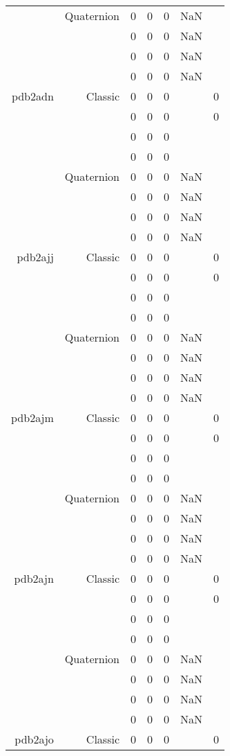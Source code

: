 \begin{xltabular}{\textwidth}{r|rcccSc}
& Quaternion & 0 & 0 & 0 & NaN & \\
& & 0 & 0 & 0 & NaN & \\
& & 0 & 0 & 0 & NaN & \\
& & 0 & 0 & 0 & NaN & \\ \addlinespace
pdb2adn & Classic & 0 & 0 & 0 & & 0 \\
& & 0 & 0 & 0 & & 0 \\
& & 0 & 0 & 0 & & \\
& & 0 & 0 & 0 & & \\
& Quaternion & 0 & 0 & 0 & NaN & \\
& & 0 & 0 & 0 & NaN & \\
& & 0 & 0 & 0 & NaN & \\
& & 0 & 0 & 0 & NaN & \\ \addlinespace
pdb2ajj & Classic & 0 & 0 & 0 & & 0 \\
& & 0 & 0 & 0 & & 0 \\
& & 0 & 0 & 0 & & \\
& & 0 & 0 & 0 & & \\
& Quaternion & 0 & 0 & 0 & NaN & \\
& & 0 & 0 & 0 & NaN & \\
& & 0 & 0 & 0 & NaN & \\
& & 0 & 0 & 0 & NaN & \\ \addlinespace
pdb2ajm & Classic & 0 & 0 & 0 & & 0 \\
& & 0 & 0 & 0 & & 0 \\
& & 0 & 0 & 0 & & \\
& & 0 & 0 & 0 & & \\
& Quaternion & 0 & 0 & 0 & NaN & \\
& & 0 & 0 & 0 & NaN & \\
& & 0 & 0 & 0 & NaN & \\
& & 0 & 0 & 0 & NaN & \\ \addlinespace
pdb2ajn & Classic & 0 & 0 & 0 & & 0 \\
& & 0 & 0 & 0 & & 0 \\
& & 0 & 0 & 0 & & \\
& & 0 & 0 & 0 & & \\
& Quaternion & 0 & 0 & 0 & NaN & \\
& & 0 & 0 & 0 & NaN & \\
& & 0 & 0 & 0 & NaN & \\
& & 0 & 0 & 0 & NaN & \\ \addlinespace
pdb2ajo & Classic & 0 & 0 & 0 & & 0 \\

\end{xltabular}
